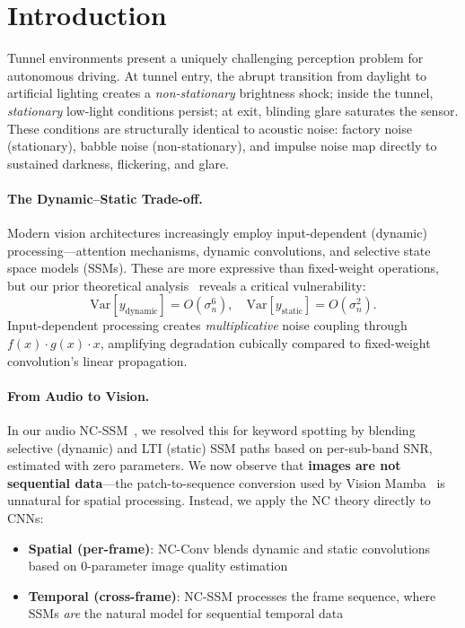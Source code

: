 \documentclass[10pt,twocolumn,letterpaper]{article}
\begin{document}
\section{Introduction}
\label{sec:intro}

Tunnel environments present a uniquely challenging perception problem for autonomous driving.
At tunnel entry, the abrupt transition from daylight to artificial lighting creates a \emph{non-stationary} brightness shock; inside the tunnel, \emph{stationary} low-light conditions persist; at exit, blinding glare saturates the sensor.
These conditions are structurally identical to acoustic noise: factory noise (stationary), babble noise (non-stationary), and impulse noise map directly to sustained darkness, flickering, and glare.

\paragraph{The Dynamic--Static Trade-off.}
Modern vision architectures increasingly employ input-dependent (dynamic) processing---attention mechanisms, dynamic convolutions, and selective state space models (SSMs).
These are more expressive than fixed-weight operations, but our prior theoretical analysis~\cite{choi2026ncssm} reveals a critical vulnerability:
\begin{equation}
\text{Var}[y_{\text{dynamic}}] = O(\sigma_n^6), \quad
\text{Var}[y_{\text{static}}] = O(\sigma_n^2).
\label{eq:noise_var}
\end{equation}
Input-dependent processing creates \emph{multiplicative} noise coupling through $f(x) \cdot g(x) \cdot x$, amplifying degradation cubically compared to fixed-weight convolution's linear propagation.

\paragraph{From Audio to Vision.}
In our audio NC-SSM~\cite{choi2026ncssm}, we resolved this for keyword spotting by blending selective (dynamic) and LTI (static) SSM paths based on per-sub-band SNR, estimated with zero parameters.
We now observe that \textbf{images are not sequential data}---the patch-to-sequence conversion used by Vision Mamba~\cite{zhu2024visionmamba} is unnatural for spatial processing.
Instead, we apply the NC theory directly to CNNs:
\begin{itemize}
\setlength\itemsep{0pt}
\item \textbf{Spatial (per-frame)}: NC-Conv blends dynamic and static convolutions based on 0-parameter image quality estimation
\item \textbf{Temporal (cross-frame)}: NC-SSM processes the frame sequence, where SSMs \emph{are} the natural model for sequential temporal data
\end{itemize}
\end{document}
